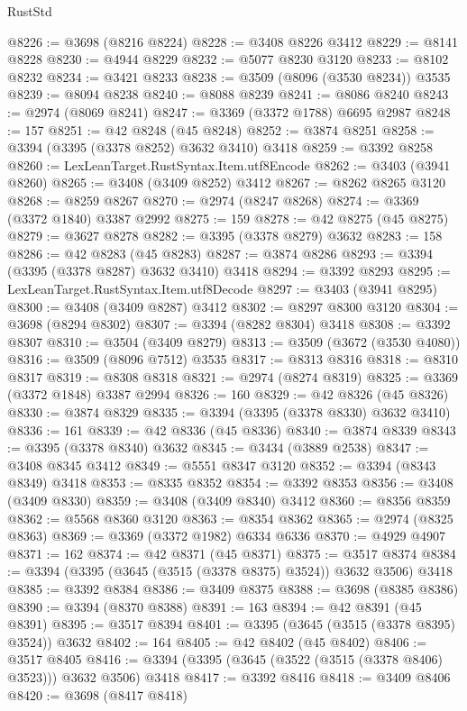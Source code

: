 \begin{lexlean}{RustStd}
\begin{coremodule}
@8226 := @3698 (@8216 @8224)
@8228 := @3408 @8226 @3412
@8229 := @8141 @8228
@8230 := @4944 @8229
@8232 := @5077 @8230 @3120
@8233 := @8102 @8232
@8234 := @3421 @8233
@8238 := @3509 (@8096 (@3530 @8234)) @3535
@8239 := @8094 @8238
@8240 := @8088 @8239
@8241 := @8086 @8240
@8243 := @2974 (@8069 @8241)
@8247 := @3369 (@3372 @1788) @6695 @2987
@8248 := 157
@8251 := @42 @8248 (@45 @8248)
@8252 := @3874 @8251
@8258 := @3394 (@3395 (@3378 @8252) @3632 @3410) @3418
@8259 := @3392 @8258
@8260 := LexLeanTarget.RustSyntax.Item.utf8Encode
@8262 := @3403 (@3941 @8260)
@8265 := @3408 (@3409 @8252) @3412
@8267 := @8262 @8265 @3120
@8268 := @8259 @8267
@8270 := @2974 (@8247 @8268)
@8274 := @3369 (@3372 @1840) @3387 @2992
@8275 := 159
@8278 := @42 @8275 (@45 @8275)
@8279 := @3627 @8278
@8282 := @3395 (@3378 @8279) @3632
@8283 := 158
@8286 := @42 @8283 (@45 @8283)
@8287 := @3874 @8286
@8293 := @3394 (@3395 (@3378 @8287) @3632 @3410) @3418
@8294 := @3392 @8293
@8295 := LexLeanTarget.RustSyntax.Item.utf8Decode
@8297 := @3403 (@3941 @8295)
@8300 := @3408 (@3409 @8287) @3412
@8302 := @8297 @8300 @3120
@8304 := @3698 (@8294 @8302)
@8307 := @3394 (@8282 @8304) @3418
@8308 := @3392 @8307
@8310 := @3504 (@3409 @8279)
@8313 := @3509 (@3672 (@3530 @4080))
@8316 := @3509 (@8096 @7512) @3535
@8317 := @8313 @8316
@8318 := @8310 @8317
@8319 := @8308 @8318
@8321 := @2974 (@8274 @8319)
@8325 := @3369 (@3372 @1848) @3387 @2994
@8326 := 160
@8329 := @42 @8326 (@45 @8326)
@8330 := @3874 @8329
@8335 := @3394 (@3395 (@3378 @8330) @3632 @3410)
@8336 := 161
@8339 := @42 @8336 (@45 @8336)
@8340 := @3874 @8339
@8343 := @3395 (@3378 @8340) @3632
@8345 := @3434 (@3889 @2538)
@8347 := @3408 @8345 @3412
@8349 := @5551 @8347 @3120
@8352 := @3394 (@8343 @8349) @3418
@8353 := @8335 @8352
@8354 := @3392 @8353
@8356 := @3408 (@3409 @8330)
@8359 := @3408 (@3409 @8340) @3412
@8360 := @8356 @8359
@8362 := @5568 @8360 @3120
@8363 := @8354 @8362
@8365 := @2974 (@8325 @8363)
@8369 := @3369 (@3372 @1982) @6334 @6336
@8370 := @4929 @4907
@8371 := 162
@8374 := @42 @8371 (@45 @8371)
@8375 := @3517 @8374
@8384 := @3394 (@3395 (@3645 (@3515 (@3378 @8375) @3524)) @3632 @3506) @3418
@8385 := @3392 @8384
@8386 := @3409 @8375
@8388 := @3698 (@8385 @8386)
@8390 := @3394 (@8370 @8388)
@8391 := 163
@8394 := @42 @8391 (@45 @8391)
@8395 := @3517 @8394
@8401 := @3395 (@3645 (@3515 (@3378 @8395) @3524)) @3632
@8402 := 164
@8405 := @42 @8402 (@45 @8402)
@8406 := @3517 @8405
@8416 := @3394 (@3395 (@3645 (@3522 (@3515 (@3378 @8406) @3523))) @3632 @3506) @3418
@8417 := @3392 @8416
@8418 := @3409 @8406
@8420 := @3698 (@8417 @8418)

\end{coremodule}
\end{lexlean}
